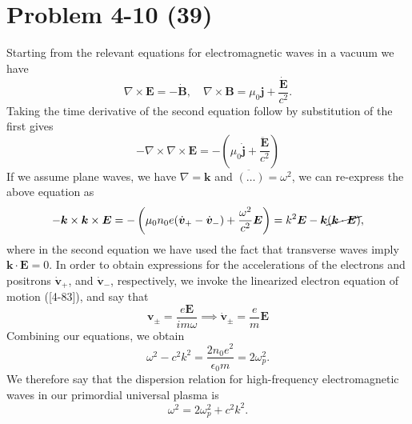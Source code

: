 \section*{Problem 4-10 (39)}
\label{sec:4-10}
Starting from the relevant equations for electromagnetic waves in a vacuum we have
\begin{equation*}
	\nabla \times \bm{E} = -\dot{\bm{B}}, \quad \nabla \times \bm{B} = \mu_0 \bm{j} + \dfrac{\dot{\bm{E}}}{c^2}.
\end{equation*}
Taking the time derivative of the second equation follow by substitution of the first gives
\begin{equation*}
	-\nabla \times \nabla \times \bm{E} = -\left(\mu_0\dot{\bm{j}} + \dfrac{\ddot{\bm{E}}}{c^2} \right)
\end{equation*}
If we assume plane waves, we have \(\nabla = \bm{k} \) and \(\ddot{(\dots)} = \omega^2 \), we can re-express the above equation as
\begin{equation*}
	-\bm{k} \times \bm{k} \times \bm{E} = -\left(\mu_0n_0e(\dot{\bm{v}}_+ - \dot{\bm{v}}_-) + \dfrac{\omega^2}{c^2}\bm{E} \right) = k^2\bm{E} - \bm{k}\cancel{(\bm{k}\cdot\bm{E})},
\end{equation*}
where in the second equation we have used the fact that transverse waves imply \(\bm{k}\cdot\bm{E} = 0 \). In order to obtain expressions for the accelerations of the electrons and positrons \(\dot{\bm{v}}_+\), and \( \dot{\bm{v}}_- \), respectively, we invoke the linearized electron equation of motion ([4-83]), and say that
\begin{equation*}
	\bm{v_\pm} = \dfrac{e\bm{E}}{im\omega} \implies \dot{\bm{v}}_\pm = \dfrac{e}{m}\bm{E} 
\end{equation*}
Combining our equations, we obtain
\begin{equation*}
	\omega^2 - c^2k^2 = \dfrac{2n_0e^2}{\epsilon_0m} = 2\omega_p^2.
\end{equation*}
We therefore say that the dispersion relation for high-frequency electromagnetic waves in our primordial universal plasma is
\begin{equation*}
	\omega^2 = 2\omega^2_p + c^2k^2.
\end{equation*} 

